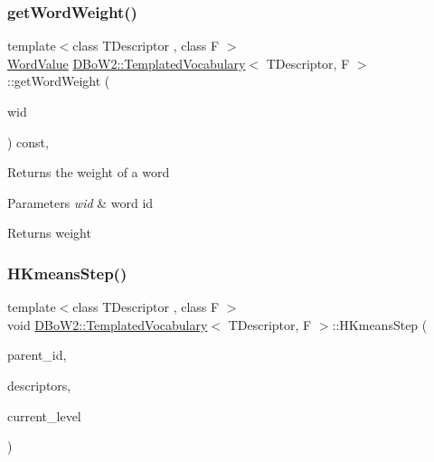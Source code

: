 \subsubsection{\texorpdfstring{get\+Word\+Weight()}{getWordWeight()}}
{\footnotesize\ttfamily template$<$class T\+Descriptor , class F $>$ \\
\mbox{\hyperlink{namespace_d_bo_w2_a55fcd7333e591a38e96b91f41bc182f6}{Word\+Value}} \mbox{\hyperlink{class_d_bo_w2_1_1_templated_vocabulary}{D\+Bo\+W2\+::\+Templated\+Vocabulary}}$<$ T\+Descriptor, F $>$\+::get\+Word\+Weight (\begin{DoxyParamCaption}\item[{\mbox{\hyperlink{namespace_d_bo_w2_ab1a0d3283b2d4690a383372ed20bfeb5}{Word\+Id}}}]{wid }\end{DoxyParamCaption}) const\hspace{0.3cm}{\ttfamily [inline]}, {\ttfamily [virtual]}}

Returns the weight of a word 
\begin{DoxyParams}{Parameters}
{\em wid} & word id \\
\hline
\end{DoxyParams}
\begin{DoxyReturn}{Returns}
weight 
\end{DoxyReturn}
\mbox{\label{class_d_bo_w2_1_1_templated_vocabulary_ab79623d30a8550414e1f4bf916869f05}} 
\subsubsection{\texorpdfstring{H\+Kmeans\+Step()}{HKmeansStep()}}
{\footnotesize\ttfamily template$<$class T\+Descriptor , class F $>$ \\
void \mbox{\hyperlink{class_d_bo_w2_1_1_templated_vocabulary}{D\+Bo\+W2\+::\+Templated\+Vocabulary}}$<$ T\+Descriptor, F $>$\+::H\+Kmeans\+Step (\begin{DoxyParamCaption}\item[{\mbox{\hyperlink{namespace_d_bo_w2_a3a0fa9c50c0df508759362d6204566f2}{Node\+Id}}}]{parent\+\_\+id,  }\item[{const vector$<$ \mbox{\hyperlink{class_d_bo_w2_1_1_templated_vocabulary_a40913d67e369e6993c2eab80a968f829}{p\+Descriptor}} $>$ \&}]{descriptors,  }\item[{int}]{current\+\_\+level }\end{DoxyParamCaption})\hspace{0.3cm}{\ttfamily [protected]}}

